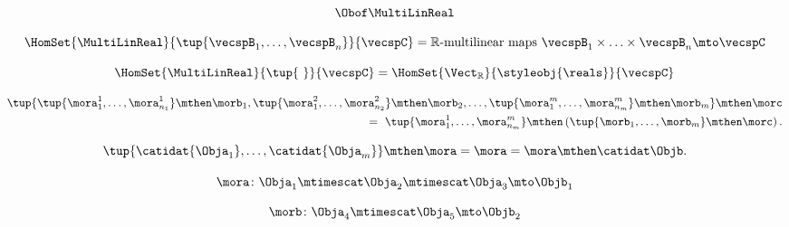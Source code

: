 {\begin{forslides}
        \begin{equation}
            \label{eq:slides_multicategories_08}
            \Obof\MultiLinReal
        \end{equation}

        \begin{equation}
            \label{eq:slides_multicategories_09}
            \HomSet{\MultiLinReal}{\tup{\vecspB_1,\ldots,\vecspB_n}}{\vecspC} = \mathbb{R}\text{-multilinear maps } \vecspB_1 \times \ldots \times \vecspB_n \mto \vecspC
        \end{equation}

        \begin{equation}
            \label{eq:slides_multicategories_10}
            \HomSet{\MultiLinReal}{\tup{ \ }}{\vecspC}=\HomSet{\Vect_{\mathbb{R}}}{ \styleobj{\reals} }{\vecspC}
        \end{equation}

        \begin{equation}
            \label{eq:slides_multicategories_11}
            \begin{aligned}
                \tup{ \tup{\mora_{1}^1,\ldots, \mora_{n_1}^1} \mthen \morb_1, \tup{\mora_{1}^2,\ldots, \mora_{n_2}^2 }\mthen \morb_2,\ldots, \tup{ \mora_{1}^m,\ldots, \mora_{n_m}^m } \mthen \morb_m } \mthen \morc \\ = \ \tup{ \mora_{1}^1,\ldots, \mora_{n_m}^m } \mthen \left ( \tup{ \morb_{1},\ldots, \morb_{m} } \mthen \morc \right ).
            \end{aligned}
        \end{equation}

        \begin{equation}
            \label{eq:slides_multicategories_12}
            \tup{\catidat{\Obja_1},\ldots, \catidat{\Obja_m}}
            \mthen \mora = \mora = \mora \mthen \catidat\Objb.
        \end{equation}

        \begin{equation}
            \label{eq:slides_multicategories_13}
            \mora \colon \Obja_1 \mtimescat \Obja_2 \mtimescat \Obja_3 \mto \Objb_1
        \end{equation}

        \begin{equation}
            \label{eq:slides_multicategories_14}
            \morb \colon \Obja_4 \mtimescat \Obja_5 \mto \Objb_2
        \end{equation}


\end{forslides}}
